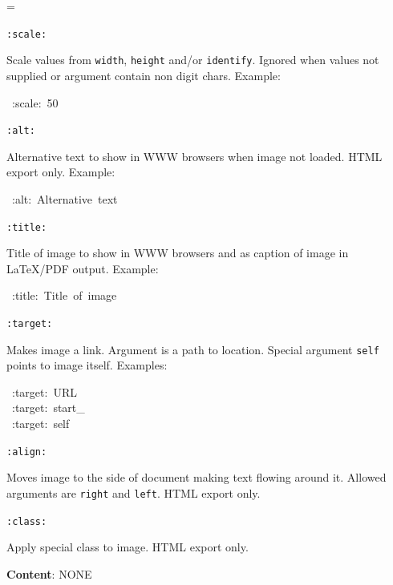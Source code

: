 \documentclass[12pt]{article}
\newenvironment{deflist}[1]{%
\begin{list}{}
{\renewcommand{\makelabel}[1]{\textbf{##1}\hfill}
\settowidth{\labelwidth}{\textbf{#1}}
\leftmargin=\labelwidth
\advance \leftmargin\labelsep}}
{\end{list}}
\begin{document}
\begin{itemize}
\begin{deflist}{iii}
\item[ \texttt{:scale:}]

Scale values from \texttt{width}, \texttt{height} and/or \texttt{identify}. Ignored
when values not supplied or argument contain non digit chars. Example:

\begin{ttfamily}\begin{flushleft}
\mbox{~:scale:~50}\\
\end{flushleft}\end{ttfamily}

\item[ \texttt{:alt:}]

Alternative text to show in WWW browsers when image not loaded. HTML
export only. Example:

\begin{ttfamily}\begin{flushleft}
\mbox{~:alt:~Alternative~text}\\
\end{flushleft}\end{ttfamily}

\item[ \texttt{:title:}]

Title of image to show in WWW browsers and as caption of image in
\LaTeX{}/PDF output. Example:

\begin{ttfamily}\begin{flushleft}
\mbox{~:title:~Title~of~image}\\
\end{flushleft}\end{ttfamily}

\item[ \texttt{:target:}]

Makes image a link. Argument is a path to location. Special argument
\texttt{self} points to image itself. Examples:

\begin{ttfamily}\begin{flushleft}
\mbox{~:target:~URL}\\
\mbox{~:target:~start\_}\\
\mbox{~:target:~self}\\
\end{flushleft}\end{ttfamily}

\item[ \texttt{:align:}]

Moves image to the side of document making text flowing around it.
Allowed arguments are \texttt{right} and \texttt{left}. HTML export only.

\item[ \texttt{:class:}]

Apply special class to image. HTML export only.
\end{deflist}

\item
\textbf{Content}: NONE
\end{itemize}
\hypertarget{limage-examples}{}
\end{document}
